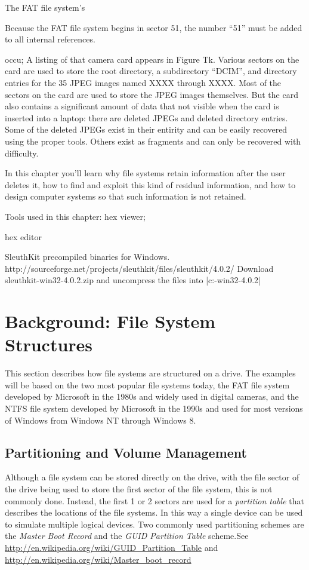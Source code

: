 \documentclass[11pt,letter]{book}
\newcommand{\wikipedia}[1]{See \url{#1}}
\newcommand{\wikipediab}[1]{ and \url{#1}}
\begin{document}
The FAT file system's 

Because the FAT file system begins in sector 51, the number ``51''
must be added to all internal references.

occu; A listing of
that camera card appears in Figure Tk. Various sectors on the card are
used to store the root directory, a subdirectory ``DCIM'', and
directory entries for the 35 JPEG
images named XXXX through XXXX. Most of the sectors on the card are
used to store the JPEG images themselves. But the card also contains a
significant amount of data that not visible when the card is
inserted into a laptop: there are deleted JPEGs and deleted directory
entries. Some of the deleted JPEGs exist in their entirity and can be
easily recovered using the proper tools. Others exist as fragments and
can only be recovered with difficulty. 

In this chapter you'll learn why file systems retain information after the
user deletes it, how to find and exploit this kind of residual
information, and how to design computer systems so that such
information is not retained.

Tools used in this chapter: hex viewer;

hex editor

SleuthKit precompiled binaries for
Windows. http://sourceforge.net/projects/sleuthkit/files/sleuthkit/4.0.2/
  Download sleuthkit-win32-4.0.2.zip and uncompress the files into
  |c:\sleuthkit-win32-4.0.2|



\section{Background: File System Structures}
This section describes how file systems are structured on a drive. The
examples will be based on the two most popular file systems today, the
FAT file system developed by Microsoft in the 1980s and widely used in
digital cameras, and the NTFS file system developed by Microsoft in
the 1990s and used for most versions of Windows from Windows NT
through Windows 8.


\subsection{Partitioning and Volume Management}

Although a file system can be stored directly on the drive, with the
file sector of the drive being used to store the first sector of the
file system, this is not commonly done. Instead, the first 1 or 2
sectors are used for a \emph{partition table} that describes the
locations of the file systems. In this way a single device can be used
to simulate multiple logical devices. Two commonly used partitioning
schemes are the \emph{Master Boot Record} and the \emph{GUID Partition
  Table} scheme.\wikipedia{http://en.wikipedia.org/wiki/GUID_Partition_Table}
       \wikipediab{http://en.wikipedia.org/wiki/Master_boot_record}
\end{document}
